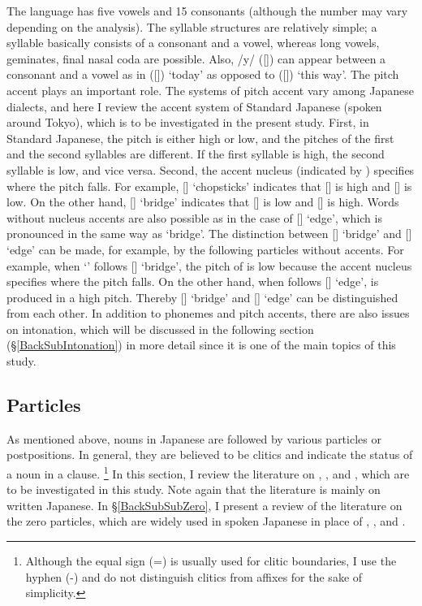 The language has five vowels and 15 consonants (although the number may vary depending on the analysis).
The syllable structures are relatively simple;
a syllable basically consists of a consonant and a vowel,
whereas long vowels, geminates, final nasal coda are possible.
Also, /y/ ([]) can appear between a consonant and a vowel
as in  ([]) `today' as opposed to  ([]) `this way'.
The pitch accent plays an important role.
The systems of pitch accent vary among Japanese dialects,
and here I review the accent system of Standard Japanese (spoken around Tokyo),
which is to be investigated in the present study.
First, in Standard Japanese,
the pitch is either high or low, and
the pitches of the first and the second syllables are different.
If the first syllable is high, the second syllable is low,
and vice versa.
Second, the accent nucleus (indicated by {\tcorner}) specifies where the pitch falls.
For example,
[] `chopsticks' indicates that [] is high and [] is low.
On the other hand, [] `bridge' indicates that
[] is low and [] is high.
Words without nucleus accents are also possible as in the case of [] `edge',
which is pronounced in the same way as `bridge'.
The distinction between [] `bridge' and [] `edge' can be made, for example, by the following particles without accents.
For example, when  `' follows [] `bridge', the pitch of  is low
because the accent nucleus specifies where the pitch falls.
On the other hand, when  follows [] `edge',  is produced in a high pitch.
Thereby [] `bridge' and [] `edge' can be distinguished from each other.
In addition to phonemes and pitch accents,
there are also issues on intonation, which will be discussed in the following section (\S \ref{BackSubIntonation}) in more detail since it is one of the main topics of this study.


\subsection{Particles}\label{BackSubSecParticles}

As mentioned above,
nouns in Japanese are followed by various particles or postpositions.
In general, they are believed to be clitics and indicate the status of a noun in a clause.%
 \footnote{
 Although the equal sign (=) is usually used for clitic boundaries,
 I use the hyphen (-) and do not distinguish clitics from affixes for the sake of simplicity.
 }
In this section, I review the literature on , , and ,
which are to be investigated in this study.
Note again that the literature is mainly on written Japanese.
In \S \ref{BackSubSubZero},
I present a review of the literature on the zero particles,
which are widely used in spoken Japanese in place of , , and .

